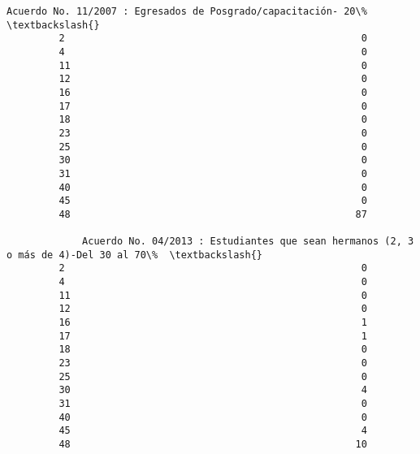 \documentclass[11pt]{article}
\begin{document}
\begin{Verbatim}[commandchars=\\\{\}]
             Acuerdo No. 11/2007 : Egresados de Posgrado/capacitación- 20\%  \textbackslash{}
         2                                                   0               
         4                                                   0               
         11                                                  0               
         12                                                  0               
         16                                                  0               
         17                                                  0               
         18                                                  0               
         23                                                  0               
         25                                                  0               
         30                                                  0               
         31                                                  0               
         40                                                  0               
         45                                                  0               
         48                                                 87               
         
             Acuerdo No. 04/2013 : Estudiantes que sean hermanos (2, 3 o más de 4)-Del 30 al 70\%  \textbackslash{}
         2                                                   0                                     
         4                                                   0                                     
         11                                                  0                                     
         12                                                  0                                     
         16                                                  1                                     
         17                                                  1                                     
         18                                                  0                                     
         23                                                  0                                     
         25                                                  0                                     
         30                                                  4                                     
         31                                                  0                                     
         40                                                  0                                     
         45                                                  4                                     
         48                                                 10                                     
         

\end{Verbatim}
\end{document}
